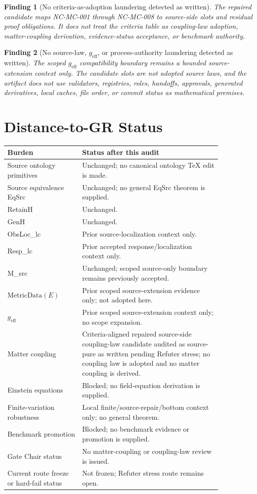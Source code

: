 \documentclass[11pt]{article}
\newcommand{\geff}{g_{\mathrm{eff}}}
\newcommand{\MetricData}{\mathrm{MetricData}}
\newtheorem{finding}{Finding}
\begin{document}
\begin{finding}[No criteria-as-adoption laundering detected as written]
The repaired candidate maps NC-MC-001 through NC-MC-008 to source-side slots
and residual proof obligations. It does not treat the criteria table as
coupling-law adoption, matter-coupling derivation, evidence-status acceptance,
or benchmark authority.
\end{finding}

\begin{finding}[No source-law, \(\geff\), or process-authority laundering detected as written]
The scoped \(\geff\) compatibility boundary remains a bounded source-extension
context only. The candidate slots are not adopted source laws, and the artifact
does not use validators, registries, roles, handoffs, approvals, generated
derivatives, local caches, file order, or commit status as mathematical
premises.
\end{finding}

\section{Distance-to-GR Status}

\begin{longtable}{p{0.30\linewidth}p{0.56\linewidth}}
\toprule
Burden & Status after this audit \\
\midrule
Source ontology primitives & Unchanged; no canonical ontology TeX edit is made. \\
Source equivalence EqSrc & Unchanged; no general EqSrc theorem is supplied. \\
RetainH & Unchanged. \\
GenH & Unchanged. \\
ObsLoc\_lc & Prior source-localization context only. \\
Resp\_lc & Prior accepted response/localization context only. \\
M\_src & Unchanged; scoped source-only boundary remains previously accepted. \\
\(\MetricData(E)\) & Prior scoped source-extension evidence only; not adopted here. \\
\(\geff\) & Prior scoped source-extension context only; no scope expansion. \\
Matter coupling & Criteria-aligned repaired source-side coupling-law candidate audited as source-pure as written pending Refuter stress; no coupling law is adopted and no matter coupling is derived. \\
Einstein equations & Blocked; no field-equation derivation is supplied. \\
Finite-variation robustness & Local finite/source-repair/bottom context only; no general theorem. \\
Benchmark promotion & Blocked; no benchmark evidence or promotion is supplied. \\
Gate Chair status & No matter-coupling or coupling-law review is issued. \\
Current route freeze or hard-fail status & Not frozen; Refuter stress route remains open. \\
\bottomrule
\end{longtable}
\end{document}
